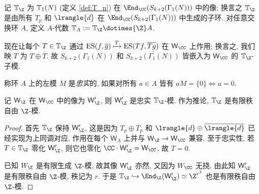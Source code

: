 \begin{definition}\label{def:cohomological-Hecke-algebra} 
	记 $\HkT_{\Z}$ 为 $\mathbb{T}_1(N)$ (定义 \ref{def:T_n}) 在 $\End_{\CC}(S_{k+2}(\Gamma_1(N)))$ 中的像; 换言之 $\HkT_{\Z}$ 是由所有 $T_p$ 和 $\lrangle{d}$ 在 $\End_{\CC}(S_{k+2}(\Gamma_1(N)))$ 中生成的子环. 对任意交换环 $A$, 定义 $A$-代数 $\HkT_A := \HkT_{\Z} \dotimes{\Z} A$.
\end{definition}

现在让每个 $T \in \HkT_{\Z}$ 通过 $\mathrm{ES}(f, \overline{g}) \xmapsto{T} \mathrm{ES}(Tf, \overline{Tg})$ 在 $\mathsf{W}_{\CC}$ 上作用; 换言之, 我们映 $T$ 为 $T \oplus \overline{T}$. 故 $S_{k+2}(\Gamma_1(N))$ 和 $\overline{S_{k+2}(\Gamma_1(N))}$ 皆嵌入为 $\mathsf{W}_{\CC}$ 的 $\HkT_{\Z}$-子模.

称环 $A$ 上的左模 $M$ 是\emph{忠实}的, 如果对所有 $a \in A$ 皆有 $aM = \{0\} \iff a = 0$.

\begin{lemma}\label{prop:Hecke-freeness}
	记 $\mathsf{W}_{\Z}$ 在 $\mathsf{W}_{\CC}$ 中的像为 $\mathsf{W}'_{\Z}$, 则 $\mathsf{W}'_{\Z}$ 是忠实 $\HkT_{\Z}$-模. 作为推论, $\HkT_{\Z}$ 是有限秩自由 $\Z$-模.
\end{lemma}
\begin{proof}
	首先 $\HkT_{\Z}$ 保持 $\mathsf{W}'_{\Z}$, 这是因为 $T_p \oplus \overline{T_p}$ 和 $\lrangle{d} \oplus \overline{\lrangle{d}}$ 已经实现为上同调对应, 作用在每个 $\mathsf{W}_A$ 上并与 $\mathsf{W}_{\Z} \to \mathsf{W}_{\CC}$ 兼容. 至于忠实性, 若 $T \in \HkT_{\Z}$ 零化 $\mathsf{W}'_{\Z}$, 则它也零化 $\CC \cdot \mathsf{W}'_{\Z} = \mathsf{W}_{\CC}$, 故 $T=0$.

	已知 $W_{\Z}$ 是有限生成 $\Z$-模, 故其像 $\mathsf{W}'_{\Z}$ 亦然, 又因为 $W_{\CC}$ 无挠, 由此知 $\mathsf{W}'_{\Z}$ 是有限秩自由 $\Z$-模, 秩记为 $r$. 于是 $\HkT_{\Z} \hookrightarrow \End_{\Z}(\mathsf{W}'_{\Z}) \simeq \Z^{r^2}$ 也是有限秩自由 $\Z$-模.
\end{proof}

